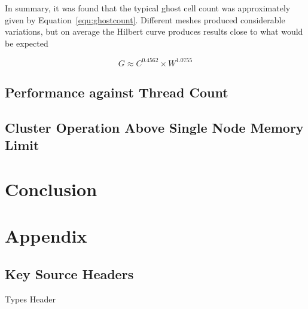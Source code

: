 \documentclass[twoside]{IIBproject}
\numberwithin{figure}{section}
\begin{document}
        In summary, it was found that the typical ghost cell count was approximately given by Equation~\ref{equ:ghostcount}. Different meshes produced considerable variations, but on average the Hilbert curve produces results close to what would be expected 

        \begin{equation}
            G \approx C^{0.4562} \times W^{1.0755}
            \label{equ:ghostcount}
        \end{equation}



    \subsection{Performance against Thread Count} %
        \label{sec:results-performance}



    \subsection{Cluster Operation Above Single Node Memory Limit}
        \label{sec:results-memory}




\section{Conclusion} %
    \label{sec:conclusions}



\printbibliography


\clearpage
\appendix

\section{Appendix} %
    \label{sec:appendix}

    \subsection{Key Source Headers} %
        \label{sec:appendix-headers}


        \begin{listing}[ht]
            \caption{Types Header}
            \label{src:types}
            \inputminted[mathescape,fontsize=\footnotesize]{cpp}{headers/types.h}
        \end{listing}
\end{document}

